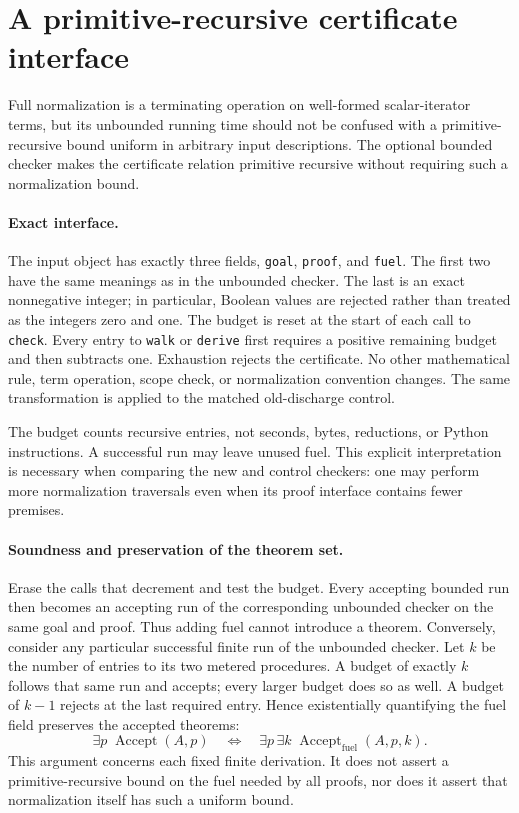 \section{A primitive-recursive certificate interface}
\label{sec:fuel-interface}

Full normalization is a terminating operation on well-formed scalar-iterator
terms, but its unbounded running time should not be confused with a
primitive-recursive bound uniform in arbitrary input descriptions. The
optional bounded checker makes the certificate relation primitive recursive
without requiring such a normalization bound.

\paragraph{Exact interface.}
The input object has exactly three fields, \texttt{goal}, \texttt{proof}, and
\texttt{fuel}. The first two have the same meanings as in the unbounded
checker. The last is an exact nonnegative integer; in particular, Boolean
values are rejected rather than treated as the integers zero and one. The
budget is reset at the start of each call to \texttt{check}. Every entry to
\texttt{walk} or \texttt{derive} first requires a positive remaining budget
and then subtracts one. Exhaustion rejects the certificate. No other
mathematical rule, term operation, scope check, or normalization convention
changes. The same transformation is applied to the matched old-discharge
control.

The budget counts recursive entries, not seconds, bytes, reductions, or
Python instructions. A successful run may leave unused fuel. This explicit
interpretation is necessary when comparing the new and control checkers:
one may perform more normalization traversals even when its proof interface
contains fewer premises.

\paragraph{Soundness and preservation of the theorem set.}
Erase the calls that decrement and test the budget. Every accepting bounded
run then becomes an accepting run of the corresponding unbounded checker
on the same goal and proof. Thus adding fuel cannot introduce a theorem.
Conversely, consider any particular successful finite run of the unbounded
checker. Let $k$ be the number of entries to its two metered procedures. A
budget of exactly $k$ follows that same run and accepts; every larger budget
does so as well. A budget of $k-1$ rejects at the last required entry. Hence
existentially quantifying the fuel field preserves the accepted theorems:
\[
  \exists p\;\operatorname{Accept}(A,p)
  \quad\Longleftrightarrow\quad
  \exists p\,\exists k\;\operatorname{Accept}_{\mathrm{fuel}}(A,p,k).
\]
This argument concerns each fixed finite derivation. It does not assert a
primitive-recursive bound on the fuel needed by all proofs, nor does it assert
that normalization itself has such a uniform bound.

